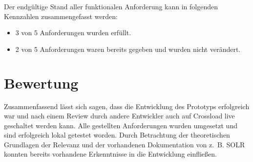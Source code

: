 Der endgültige Stand aller funktionalen Anforderung kann in folgenden Kennzahlen zusammengefasst werden:
\begin{itemize}
  \item 3 von 5 Anforderungen wurden erfüllt.
  \item 2 von 5 Anforderungen waren bereits gegeben und wurden nicht verändert.
\end{itemize}

\section{Bewertung}
\label{sec:assessment}

Zusammenfassend lässt sich sagen, dass die Entwicklung des Prototyps erfolgreich war und nach einem Review durch andere Entwickler auch auf Crossload live geschaltet werden kann.
Alle gestellten Anforderungen wurden umgesetzt und sind erfolgreich lokal getestet worden.
Durch Betrachtung der theoretischen Grundlagen der Relevanz und der vorhandenen Dokumentation von z. B. SOLR konnten bereits vorhandene Erkenntnisse in die Entwicklung einfließen.
